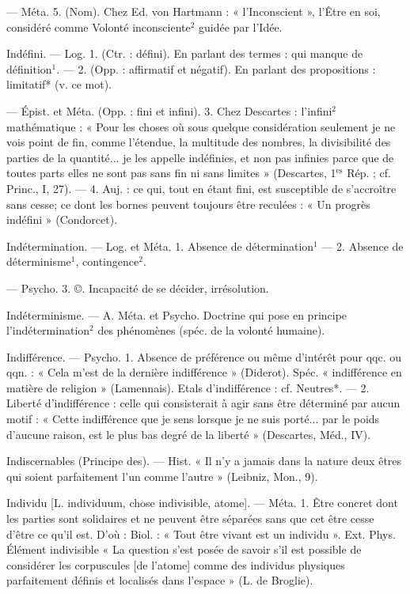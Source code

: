 — Méta. 5. (Nom). Chez Ed. von
Hartmann : « l’Inconscient », l'Être
en soi, considéré comme Volonté
inconsciente$^2$ guidée par l'Idée.

Indéfini. — Log. 1. (Ctr. : défini). En
parlant des termes : qui manque de
définition$^1$. — 2. (Opp. : affirmatif
et négatif). En parlant des propositions : limitatif* (v. ce mot).

— Épist. et Méta. (Opp. : fini
et infini). 3. Chez Descartes : l'infini$^2$
mathématique : « Pour les choses où
sous quelque considération seulement
je ne vois point de fin, comme l’étendue, la multitude des nombres, la
divisibilité des parties de la quantité... je les appelle indéfinies, et
non pas infinies parce que de toutes
parts elles ne sont pas sans fin ni
sans limites » (Descartes, 1$^\text{es}$ Rép. ;
cf. Princ., I, 27). — 4. Auj. : ce qui,
tout en étant fini, est susceptible
de s’accroître sans cesse; ce dont les
bornes peuvent toujours être reculées : « Un progrès indéfini » (Condorcet).

Indétermination. — Log.
et Méta.
1. Absence de détermination$^1$ —
2. Absence de déterminisme$^1$, contingence$^2$.

— Psycho. 3. ©. Incapacité de se
décider, irrésolution.

Indéterminisme. — A. Méta. et Psycho. Doctrine qui pose en principe
l’indétermination$^2$ des phénomènes
(spéc. de la volonté humaine).

Indifférence. — Psycho. 1. Absence
de préférence ou même d'intérêt
pour qqc. ou qqn. : « Cela m'est de
la dernière indifférence » (Diderot).
Spéc. « indifférence en matière de
religion » (Lamennais). Etals d’indifférence : cf. Neutres*. — 2. Liberté
d'indifférence : celle qui consisterait
à agir sans être déterminé par
aucun motif : « Cette indifférence
que je sens lorsque je ne suis porté...
par le poids d’aucune raison, est le
plus bas degré de la liberté » (Descartes, Méd., IV).

Indiscernables (Principe des). — Hist.
« Il n’y a jamais dans la nature deux
êtres qui soient parfaitement l’un
comme l’autre » (Leibniz, Mon., 9).

Individu [L. individuum, chose indivisible, atome]. — Méta. 1. Être concret dont les parties sont solidaires
et ne peuvent être séparées sans que
cet être cesse d'être ce qu’il est.
D'où : Biol. : « Tout être vivant est
un individu ». Ext. Phys. Élément
indivisible « La question s'est
posée de savoir s’il est possible de
considérer les corpuscules [de
l'atome] comme des individus physiques parfaitement définis et localisés dans l’espace » (L. de Broglie).


